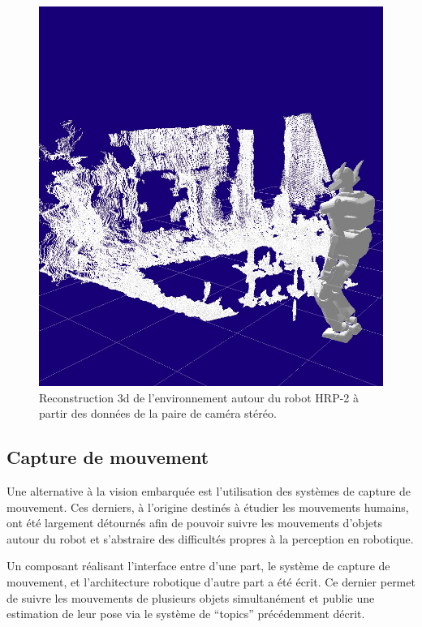 \begin{figure}
  \begin{center}
    \includegraphics[width=.95\linewidth]{src/chap4-integration/stereo1.jpg}
  \end{center}
  \caption{Reconstruction 3d de l'environnement autour du robot HRP-2
    à partir des données de la paire de caméra stéréo.}
\end{figure}


\subsection{Capture de mouvement}

Une alternative à la vision embarquée est l'utilisation des systèmes
de capture de mouvement. Ces derniers, à l'origine destinés à étudier
les mouvements humains, ont été largement détournés afin de pouvoir
suivre les mouvements d'objets autour du robot et s'abstraire des
difficultés propres à la perception en robotique.


Un composant réalisant l'interface entre d'une part, le système de
capture de mouvement, et l'architecture robotique d'autre part a été
écrit. Ce dernier permet de suivre les mouvements de plusieurs objets
simultanément et publie une estimation de leur pose via le système de
``topics'' précédemment décrit.


